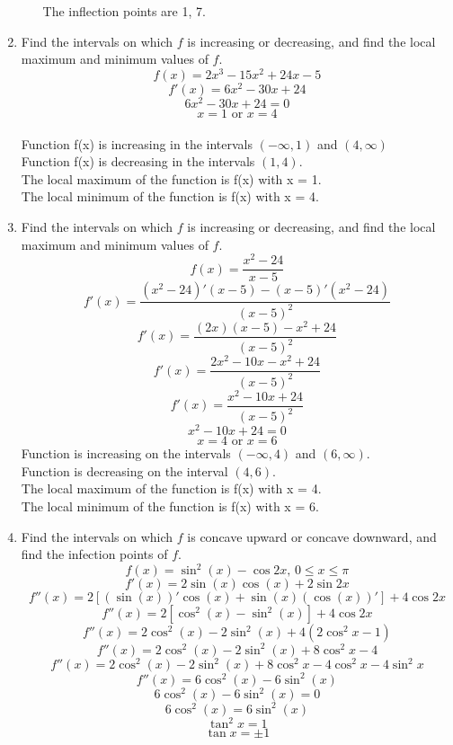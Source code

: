 \documentclass[12pt]{article}
\begin{document}
\begin{enumerate}
\begin{enumerate}
        The inflection points are 1, 7.
    \end{enumerate}
    \setcounter{enumi}{8}
    \item Find the intervals on which $f$ is increasing or decreasing, and find the local maximum and minimum values of $f$.
        \[f(x) = 2x^3 - 15x^2 + 24x - 5\]
        \[f'(x) = 6x^2 - 30x + 24\]
        \[6x^2 - 30x + 24 = 0\]
        \[x = 1 \text{ or } x = 4\]\\
        Function f(x) is increasing in the intervals $(-\infty, 1)$ and $(4, \infty)$\\
        Function f(x) is decreasing in the intervals $(1,4)$.\\
        The local maximum of the function is f(x) with x = 1.\\
        The local minimum of the function is f(x) with x = 4.
    \setcounter{enumi}{12}
    \item Find the intervals on which $f$ is increasing or decreasing, and find the local maximum and minimum values of $f$.
        \[f(x) = \frac{x^2-24}{x-5}\]
        \[f'(x) = \frac{(x^2-24)'(x-5) - (x-5)'(x^2-24)}{(x-5)^2}\]
        \[f'(x) = \frac{(2x)(x-5) - x^2 + 24}{(x-5)^2}\]
        \[f'(x) = \frac{2x^2 - 10x - x^2 + 24}{(x-5)^2}\]
        \[f'(x) = \frac{x^2 - 10x + 24}{(x-5)^2}\]
        \[x^2 - 10x + 24 = 0\]
        \[x = 4 \text{ or } x = 6\]
        Function is increasing on the intervals $(-\infty, 4)$ and $(6, \infty)$.\\
        Function is decreasing on the interval $(4,6)$.\\
        The local maximum of the function is f(x) with x = 4.\\
        The local minimum of the function is f(x) with x = 6.
        \setcounter{enumi}{16}
        \newpage
    \item Find the intervals on which $f$ is concave upward or concave downward, and find the infection points of $f$.
        \[f(x) = \sin^2(x) - \cos 2x \text{, } 0 \leq x \leq \pi\]
        \[f'(x) = 2\sin(x)\cos(x) + 2\sin 2x\]
        \[f''(x) = 2[(\sin(x))'\cos(x) + \sin(x)(\cos(x))'] + 4\cos 2x\]
        \[f''(x) = 2[\cos^2(x) - \sin^2(x)] + 4\cos 2x\]
        \[f''(x) = 2\cos^2(x) - 2\sin^2(x) + 4(2\cos^2 x - 1)\]
        \[f''(x) = 2\cos^2(x) - 2\sin^2(x) + 8\cos^2 x - 4\]
        \[f''(x) = 2\cos^2(x) - 2\sin^2(x) + 8\cos^2 x - 4\cos^2x - 4\sin^2x\]
        \[f''(x) = 6\cos^2(x) - 6\sin^2(x) \]
        \[6\cos^2(x) - 6\sin^2(x) = 0\]
        \[6\cos^2(x) = 6\sin^2(x)\]
        \[\tan^2 x = 1\]
        \[\tan x = \pm 1\]

\end{enumerate}
\end{document}
